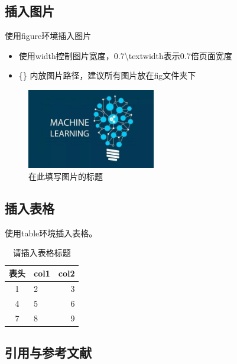 \documentclass[hyperref,a4paper,UTF8]{ctexart}
\begin{document}
\subsection{插入图片}
使用figure环境插入图片
\begin{itemize}
    \item 使用width控制图片宽度，0.7\textbackslash textwidth表示0.7倍页面宽度
    \item \{\} 内放图片路径，建议所有图片放在fig文件夹下
\end{itemize}


\begin{figure}[ht]
    \centering
    \includegraphics[width=0.5\textwidth]{fig/example.jpg}
    \caption{在此填写图片的标题}
    \label{fig:example}
\end{figure}


\subsection{插入表格}
使用table环境插入表格。

\begin{table}[ht]
    \centering
    \begin{tabular}{c|lr} %
        \toprule
        表头 & col1 & col2 \\
        \midrule
        1  & 2    & 3    \\
        \hline  %
        4  & 5    & 6    \\
        7  & 8    & 9    \\
        \bottomrule
    \end{tabular}
    \caption{请插入表格标题}
    \label{tab:example}
\end{table}







\subsection{引用与参考文献}
\end{document}
